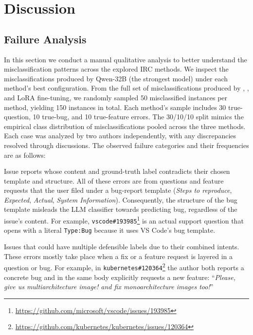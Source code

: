 
\section{Discussion}
\label{sec:discussion}

\subsection{Failure Analysis}
\label{sec:disc-failures}

In this section we conduct a manual qualitative analysis to better understand the misclassification patterns across the explored IRC methods. We inspect the misclassifications produced by Qwen-32B (the strongest model) under each method's best configuration. 
From the full set of misclassifications produced by \ragtag, \bragtag, and LoRA fine-tuning, we randomly sampled 50 misclassified instances per method, yielding 150 instances in total. Each method's sample includes 30 true-question, 10 true-bug, and 10 true-feature errors. The 30/10/10 split mimics the empirical class distribution of misclassifications pooled across the three methods. Each case was analyzed by two authors independently, with any discrepancies resolved through discussions. The observed failure categories and their frequencies are as follows:

 Issue reports whose content and ground-truth label contradicts their chosen template and structure. All of these errors are from questions and feature requests that the user filed under a bug-report template (\textit{Steps to reproduce}, \textit{Expected}, \textit{Actual}, \textit{System Information}). Consequently, the structure of the bug template misleads the LLM classifier towards predicting bug, regardless of the issue's content. For example, \texttt{vscode\#193985}\footnote{\url{https://github.com/microsoft/vscode/issues/193985}} is an actual support question that opens with a literal \texttt{Type:Bug} because it uses VS Code's bug template.

 Issues that could have multiple defensible labels due to their combined intents. These errors mostly take place when a fix or a feature request is layered in a question or bug. For example, in \texttt{kubernetes\#120364}\footnote{\url{https://github.com/kubernetes/kubernetes/issues/120364}} the author both reports a concrete bug and in the same body explicitly requests a new feature: ``\textit{Please, give us multiarchitecture image! and fix monoarchitecture images too!}''

